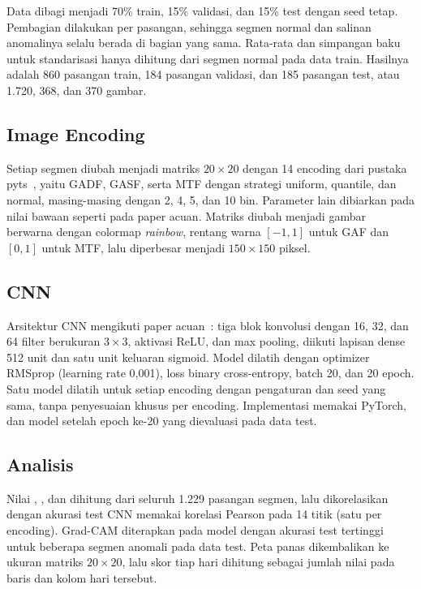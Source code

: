 Data dibagi menjadi 70\% train, 15\% validasi, dan 15\% test dengan seed tetap. Pembagian dilakukan per pasangan, sehingga segmen normal dan salinan anomalinya selalu berada di bagian yang sama. Rata-rata dan simpangan baku untuk standarisasi hanya dihitung dari segmen normal pada data train. Hasilnya adalah 860 pasangan train, 184 pasangan validasi, dan 185 pasangan test, atau 1.720, 368, dan 370 gambar.

\subsection{Image Encoding}
Setiap segmen diubah menjadi matriks $20\times20$ dengan 14 encoding dari pustaka pyts~\cite{faouzi2020}, yaitu GADF, GASF, serta MTF dengan strategi uniform, quantile, dan normal, masing-masing dengan 2, 4, 5, dan 10 bin. Parameter lain dibiarkan pada nilai bawaan seperti pada paper acuan. Matriks diubah menjadi gambar berwarna dengan colormap \textit{rainbow}, rentang warna $[-1,1]$ untuk GAF dan $[0,1]$ untuk MTF, lalu diperbesar menjadi $150\times150$ piksel.

\subsection{CNN}
Arsitektur CNN mengikuti paper acuan~\cite{rahadian2023}: tiga blok konvolusi dengan 16, 32, dan 64 filter berukuran $3\times3$, aktivasi ReLU, dan max pooling, diikuti lapisan dense 512 unit dan satu unit keluaran sigmoid. Model dilatih dengan optimizer RMSprop (learning rate 0,001), loss binary cross-entropy, batch 20, dan 20 epoch. Satu model dilatih untuk setiap encoding dengan pengaturan dan seed yang sama, tanpa penyesuaian khusus per encoding. Implementasi memakai PyTorch, dan model setelah epoch ke-20 yang dievaluasi pada data test.

\subsection{Analisis}
Nilai \dmean, \dsd, dan \dcount{} dihitung dari seluruh 1.229 pasangan segmen, lalu dikorelasikan dengan akurasi test CNN memakai korelasi Pearson pada 14 titik (satu per encoding). Grad-CAM diterapkan pada model dengan akurasi test tertinggi untuk beberapa segmen anomali pada data test. Peta panas dikembalikan ke ukuran matriks $20\times20$, lalu skor tiap hari dihitung sebagai jumlah nilai pada baris dan kolom hari tersebut.
